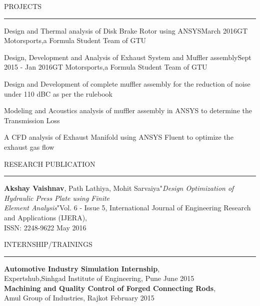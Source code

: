 \documentclass{resume} %
\renewenvironment{rSection}[1]{
    \sectionskip
    \textcolor{TsinghuaPurple}{\MakeUppercase{#1}}
    \sectionlineskip
    \hrule
    \begin{list}{}{
        \setlength{\leftmargin}{0em}
    }
    \item[]
}{\end{list}}
\begin{document}
\begin{rSection}{PROJECTS}
\begin{rSubsection}{Design and Thermal analysis of Disk Brake Rotor using ANSYS}{March 2016}{GT Motorsports,a Formula Student Team of GTU}{}
    \end{rSubsection}


    \begin{rSubsection}{Design, Development and Analysis of Exhaust System and  Muffler assembly}{Sept 2015 - Jan 2016}{GT Motorsports,a Formula Student Team of GTU}{}

        \item Design and Development of complete muffler assembly for the reduction of noise under 110 dBC as per the rulebook
        \item Modeling and Acoustics analysis of muffler assembly in ANSYS to determine the  Transmission Loss
        \item A CFD analysis of Exhaust Manifold using ANSYS Fluent to optimize the exhaust gas flow

    \end{rSubsection}

\end{rSection}

\begin{rSection}{ Research Publication } \itemsep -3pt

    {\textbf{Akshay Vaishnav}, Path Lathiya, Mohit Sarvaiya"\textit{Design Optimization of Hydraulic Press Plate using Finite \\Element Analysis}"Vol. 6 - Issue 5, International Journal of Engineering Research and Applications (IJERA), \\ISSN: 2248-9622 } \hfill May 2016 \\

\end{rSection}



\begin{rSection}{INTERNSHIP/TRAININGS} \itemsep -3pt

    {\textbf{Automotive Industry Simulation Internship}, \\Expertshub,Sinhgad Institute of Engineering, Pune } \hfill June 2015 \\
    {\textbf{Machining and Quality Control of Forged Connecting Rods}, \\Amul Group of Industries, Rajkot} \hfill February 2015 \\

\end{rSection}
\end{document}
